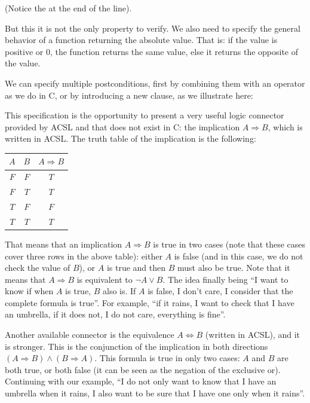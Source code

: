 


(Notice the \CodeInline{;} at the end of the line).

But this it is not the only property to verify. We also need to specify
the general behavior of a function returning the absolute value. That
is: if the value is positive or 0, the function returns the same value,
else it returns the opposite of the value.

We can specify multiple postconditions, first by combining them with an operator
\CodeInline{\&\&} as we do in C, or by introducing a new 
clause, as we illustrate here:







This specification is the opportunity to present a very useful logic
connector provided by ACSL and that does not exist in C: the implication
$A \Rightarrow B$, which is written  in
ACSL. The truth table of the implication is the following:



\begin{longtabu}{|c|c|c|} \hline
$A$ & $B$ & $A \Rightarrow B$ \\ \hline
$F$ & $F$ & $T$ \\ \hline
$F$ & $T$ & $T$ \\ \hline
$T$ & $F$ & $F$ \\ \hline
$T$ & $T$ & $T$ \\ \hline
\end{longtabu}



That means that an implication $A \Rightarrow B$ is true in two cases
(note that these cases cover three rows in the above table):
either $A$ is false (and in this case, we do not check the value of
$B$), or $A$ is true and then $B$ must also be true. Note that it means
that $A \Rightarrow B$ is equivalent to $\neg A \vee B$. The idea
finally being ``I want to know if when $A$ is true, $B$ also is. If
$A$ is false, I don't care, I consider that the complete formula is
true''. For example, ``if it rains, I want to check that I have an
umbrella, if it does not, I do not care, everything is fine''.



Another available connector is the equivalence $A \Leftrightarrow B$
(written  in ACSL), and it is
stronger. This is the conjunction of the implication in both directions
$(A \Rightarrow B) \wedge (B \Rightarrow A)$. This formula is true in
only two cases: $A$ and $B$ are both true, or both false (it can be seen
as the negation of the exclusive or). Continuing with our example, ``I
do not only want to know that I have an umbrella when it rains, I also
want to be sure that I have one only when it rains''.



